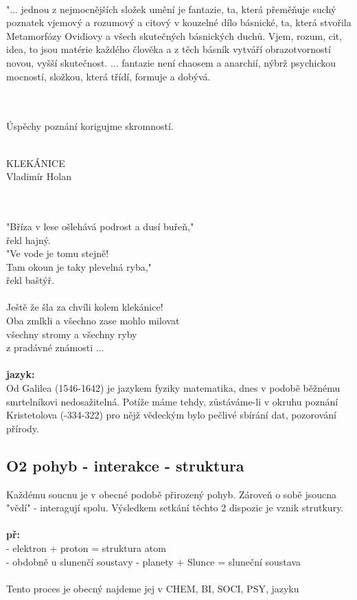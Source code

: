 \documentclass{article}
\begin{document}
\\
\begin{footnotesize}
"... jednou z nejmocnějších složek umění je fantazie, ta, která přeměňuje suchý poznatek vjemový a rozumový a citový v kouzelné dílo básnické, ta, která stvořila Metamorfózy Ovidiovy a všech skutečných básnických duchů. Vjem, rozum, cit, idea, to jsou matérie každého člověka a z těch básník vytváří obrazotvorností novou, vyšší skutečnost. ... fantazie není chaosem a anarchií, nýbrž psychickou mocností, složkou, která třídí, formuje a dobývá. 
\end{footnotesize} \\
\\
Úspěchy poznání korigujme skromností.\\\\
\begin{huge}
KLEKÁNICE \\
Vladimír Holan
\end{huge}\\
\\
"Bříza v lese ošlehává podrost a dusí buřeň,"\\
řekl hajný.\\
"Ve vode je tomu stejně! \\
Tam okoun je taky plevelná ryba," \\
řekl baštýř. \\\\
Ještě že šla za chvíli kolem klekánice!\\
Oba zmlkli a všechno zase mohlo milovat\\
všechny stromy a všechny ryby\\
z pradávné známosti ...\\\\
\textbf{jazyk:}\\
Od Galilea (1546-1642) je jazykem fyziky matematika, dnes v podobě běžnému smrtelníkovi nedosažitelná. Potíže máme tehdy, zůstáváme-li v okruhu poznání Kristetolova (-334-322) pro nějž vědeckým bylo pečlivé sbírání dat, pozorování přírody. 

\subsection*{O2 pohyb - interakce - struktura}
Každému soucnu je v obecné podobě přirozený pohyb. Zároveň o sobě jsoucna "vědí" - interagují spolu. Výsledkem setkání těchto 2 dispozic je vznik strutkury.\\\\
\textbf{př:}\\
- elektron + proton = struktura atom \\
- obdobně u slunenčí soustavy - planety + Slunce = sluneční soustava \\\\
Tento proces je obecný najdeme jej v CHEM, BI, SOCI, PSY, jazyku
\end{document}
